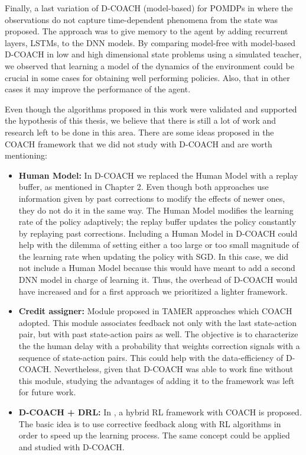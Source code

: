 Finally, a last variation of D-COACH (model-based) for POMDPs in where the observations do not capture time-dependent phenomena from the state was proposed. The approach was to give memory to the agent by adding recurrent layers, LSTMs, to the DNN models. By comparing model-free with model-based D-COACH in low and high dimensional state problems using a simulated teacher, we observed that learning a model of the dynamics of the environment could be crucial in some cases for obtaining well performing policies. Also, that in other cases it may improve the performance of the agent. 

Even though the algorithms proposed in this work were validated and supported the hypothesis of this thesis, we believe that there is still a lot of work and research left to be done in this area. There are some ideas proposed in the COACH framework that we did not study with D-COACH and are worth mentioning:

\begin{itemize}
    \item \textbf{Human Model:} In D-COACH we replaced the Human Model with a replay buffer, as mentioned in Chapter 2. Even though both approaches use information given by past corrections to modify the effects of newer ones, they do not do it in the same way. The Human Model modifies the learning rate of the policy adaptively; the replay buffer updates the policy constantly by replaying past corrections. Including a Human Model in D-COACH could help with the dilemma of setting either a too large or too small magnitude of the learning rate when updating the policy with SGD. In this case, we did not include a Human Model because this would have meant to add a second DNN model in charge of learning it. Thus, the overhead of D-COACH would have increased and for a first approach we prioritized a lighter framework.
    \item \textbf{Credit assigner:} Module proposed in TAMER approaches \cite{Knox:2009:ISA:1597735.1597738} which COACH adopted. This module associates feedback not only with the last state-action pair, but with past state-action pairs as well. The objective is to characterize the the human delay with a probability that weights correction signals with a sequence of state-action pairs. This could help with the data-efficiency of D-COACH. Nevertheless, given that D-COACH was able to work fine without this module, studying the advantages of adding it to the framework was left for future work. 
    \item \textbf{D-COACH + DRL:} In \cite{celemin2018fast}, a hybrid RL framework with COACH is proposed. The basic idea is to use corrective feedback along with RL algorithms in order to speed up the learning process. The same concept could be applied and studied with D-COACH. 
\end{itemize}

